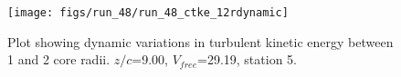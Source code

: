 \begin{figure}[H]
\centering
\texttt{[image: figs/run\_48/run\_48\_ctke\_12rdynamic]}
\caption{Plot showing dynamic variations in turbulent kinetic energy between 1 and 2 core radii. $z/c$=9.00, $V_{free}$=29.19, station 5.}
\end{figure}


